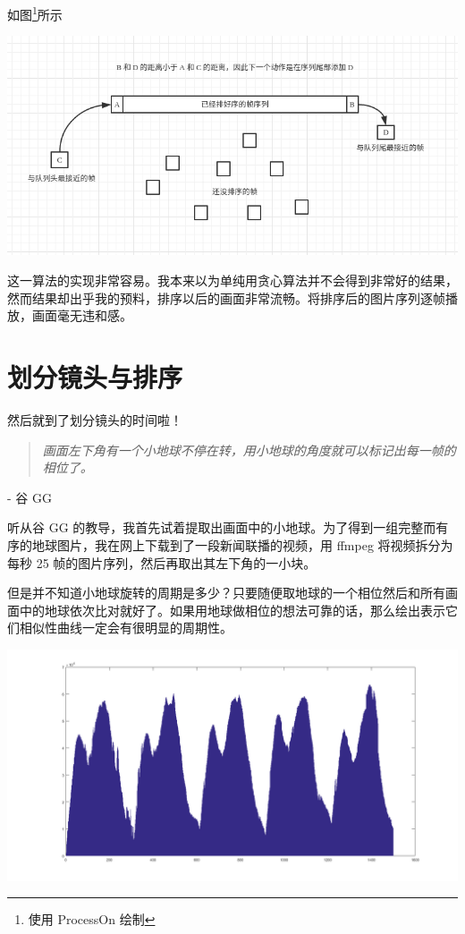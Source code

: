\documentclass[a4paper, fontset=none]{article}
\begin{document}
如图\footnote{使用 ProcessOn 绘制}所示

\begin{center}
  \includegraphics[width=\textwidth]{./sec2.png}
\end{center}

这一算法的实现非常容易。我本来以为单纯用贪心算法并不会得到非常好的结果，然而结果却出乎我的预料，排序以后的画面非常流畅。将排序后的图片序列逐帧播放，画面毫无违和感。

\section{划分镜头与排序}
\label{sec:镜头分组排序}

然后就到了划分镜头的时间啦！

\begin{quotation} \textit{画面左下角有一个小地球不停在转，用小地球的角度就可以标记出每一帧的相位了。} \end{quotation} \begin{flushright} - 谷 GG \end{flushright}

听从谷 GG 的教导，我首先试着提取出画面中的小地球。为了得到一组完整而有序的地球图片，我在网上下载到了一段新闻联播的视频，用 ffmpeg 将视频拆分为每秒 25 帧的图片序列，然后再取出其左下角的一小块。

但是并不知道小地球旋转的周期是多少？只要随便取地球的一个相位然后和所有画面中的地球依次比对就好了。如果用地球做相位的想法可靠的话，那么绘出表示它们相似性曲线一定会有很明显的周期性。

\begin{center}
  \includegraphics[width=\textwidth]{./earth.png}
\end{center}
\end{document}
